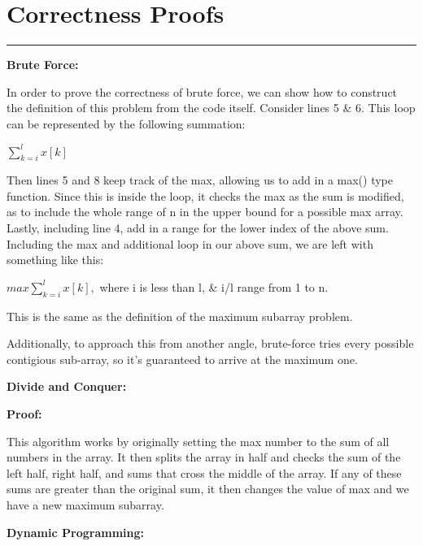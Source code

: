 \documentclass[letterpaper,10pt,titlepage,fleqn]{article}
\begin{document}
\lstset{ numbers=none }

\section*{Correctness Proofs}
\hrule

\begin{centering}
\textbf{Brute Force:}
\end{centering}

In order to prove the correctness of brute force, we can show how to construct the definition of this problem from the code itself. Consider lines 5 \& 6. This loop can be represented by the following summation:

$\sum\limits_{k=i}^{l} x[k]$

Then lines 5 and 8 keep track of the max, allowing us to add in a max() type function. Since this is inside the loop, it checks the max as the sum is modified, as to include the whole range of n in the upper bound for a possible max array. Lastly, including line 4, add in a range for the lower index of the above sum. Including the max and additional loop in our above sum, we are left with something like this:

$max \sum\limits_{k=i}^{l} x[k],$ where i is less than l, \& i/l range from 1 to n.

This is the same as the definition of the maximum subarray problem.

Additionally, to approach this from another angle, brute-force tries every possible contigious sub-array, so it's guaranteed to arrive at the maximum one.

\begin{centering}
\textbf{Divide and Conquer:}
\end{centering}


\textbf{Proof:}

This algorithm works by originally setting the max number to the sum of all numbers in the array. It then splits the array in half and checks the sum of the left half, right half, and sums that cross the middle of the array. If any of these sums are greater than the original sum, it then changes the value of max and we have a new maximum subarray.







\begin{centering}
\textbf{Dynamic Programming:}
\end{centering}
\end{document}
